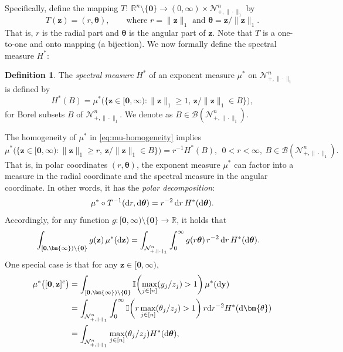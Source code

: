 \documentclass[12pt]{article}
\theoremstyle{plain}
\theoremstyle{plain}
\theoremstyle{definition}
\newtheorem{defn}{Definition}[section]
\newcommand{\R}{\mathbb{R}}
\newcommand{\intd}{\mathrm{d}}
\newcommand{\punitsphereone}[1]{\mathcal{N}_{+,\|\cdot\|_1}^{#1}}
\begin{document}
Specifically, define the mapping $T:~\mathbb{R}^{n}\setminus\{\mathbf{0}\}\to(0,\infty)\times\punitsphereone{n}$ by
\begin{equation}\label{eq:polar}
	T(\mathbf{z})=(r,\boldsymbol{\theta}),
	\qquad
	\text{where } r=\|\mathbf{z}\|_1
	\text{ and }
	\boldsymbol{\theta}=\mathbf{z}/\|\mathbf{z}\|_1.
\end{equation}
That is, $r$ is the radial part and $\bm{\theta}$ is the angular part of $\mathbf{z}$. Note that $T$ is a one-to-one and onto mapping (a bijection).
We now formally define the spectral measure $H^*$:
\begin{defn}
	The \emph{spectral measure} $H^*$ of an exponent measure $\mu^*$ on
	$\punitsphereone{n}$ 
	is defined by
	\begin{equation}
		H^*(B)
		=
		\mu^{*}\bigl(\{\mathbf{z}\in[\mathbf{0},\bm{\infty}):\|\mathbf{z}\|_1\ge1,\,
		\mathbf{z}/\|\mathbf{z}\|_1\in B\}\bigr),
	\end{equation}
	for Borel subsets $B$ of $\punitsphereone{n}$. We denote as $B\in \mathcal{B}(\punitsphereone{n})$.
\end{defn}
The homogeneity of $\mu^{*}$ in \eqref{eq:mu-homogeneity} implies
\[
\mu^{*}\bigl(\{\mathbf{z}\in[\mathbf{0},\bm{\infty}):\|\mathbf{z}\|_1\ge r,\,
\mathbf{z}/\|\mathbf{z}\|_1\in B\}\bigr)
=
r^{-1}  H^*(B),~~0<r<\infty,~B\in \mathcal{B}(\punitsphereone{n}).
\]
That is, in polar coordinates $(r,\bm{\theta})$, the exponent measure $\mu^*$ can factor into a measure in the radial coordinate and the spectral measure in the angular coordinate. In other words, it has the \emph{polar decomposition}:
\begin{equation*}
	\mu^{*}\circ T^{-1}({\rm d}r,{\rm d}\boldsymbol{\theta})
	=
	r^{-2}\,{\rm d}r\,H^*({\rm d}\boldsymbol{\theta}).
\end{equation*}
Accordingly, for any function $g:[\mathbf{0},\bm{\infty})\setminus\{\mathbf{0}\}\to\R$, it holds that 
\begin{align*}
	\int_{[\mathbf{0},\bm{\infty})\setminus\{\mathbf{0}\}} g(\mathbf{z})\,\mu^{*}({\rm d}\mathbf{z})
	&=
	\int_{\punitsphereone{n}}\int_{0}^{\infty}
	g\!\left(r\boldsymbol{\theta}\right)
	r^{-2}\,{\rm d}r\,H^*({\rm d}\boldsymbol{\theta}).
\end{align*}
One special case is that for any $\mathbf{z}\in[\mathbf{0},\bm{\infty})$,
\begin{align}
	\label{eq:v2-260127-4}
	\mu^{*}\bigl([\mathbf{0},\mathbf{z}]^c\bigr)
	&=\int_{[\mathbf{0},\bm{\infty})\setminus\{\mathbf{0}\}}
	\mathbb{I}\!\left(
	\max_{j\in[n]}(y_j/z_j)>1
	\right)\mu^*(\intd\mathbf{y})\notag\\
	& =\int_{\punitsphereone{n}}\int_{0}^{\infty}
	\mathbb{I}\!\left(
	r\max_{j\in[n]}(\theta_j/z_j)>1
	\right)r\intd r^{-2} H^*(\intd\bm{\theta})\notag\\
	&=\int_{\punitsphereone{n}}\max_{j\in[n]}(\theta_j/z_j)H^*({\rm d}\boldsymbol{\theta}),
\end{align}
\end{document}
